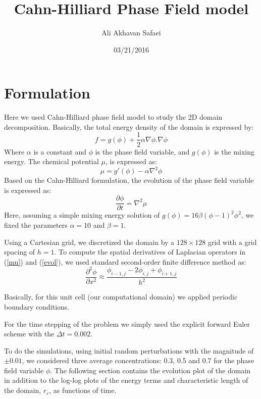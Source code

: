\documentclass[a4paper,6pt]{article}
\begin{document}
\title{\bf Cahn-Hilliard Phase Field model}
\author{Ali Akhavan Safaei}
\date{03/21/2016}
\maketitle

\section{Formulation}

Here we used Cahn-Hilliard phase field model to study the 2D domain decomposition. Basically, the total energy density of the domain is expressed by:
\begin{equation}\label{f}
f = g(\phi) + \frac{1}{2}\alpha \nabla\phi.\nabla\phi
\end{equation}
Where $\alpha$ is a constant and $\phi$ is the phase field variable, and $g(\phi)$ is the mixing energy. The chemical potential $\mu$, is expressed as:
\begin{equation}\label{mu}
\mu = g'(\phi) - \alpha \nabla^2\phi
\end{equation}
Based on the Cahn-Hilliard formulation, the evolution of the phase field variable is expressed as:
\begin{equation}\label{evol}
\frac{\partial \phi}{\partial t} = \nabla^2\mu
\end{equation}
Here, assuming a simple mixing energy solution of $g(\phi)= 16\beta(\phi-1)^2\phi^2$, we fixed the parameters $\alpha=10$ and $\beta=1$.

Using a Cartesian grid, we discretized the domain by a $128 \times 128$ grid with a grid spacing of $h=1$. To compute the spatial derivatives of Laplacian operators in (\ref{mu}) and (\ref{evol}), we used standard second-order finite difference method as:
\begin{equation}
\frac{\partial^2\phi}{\partial x^2} \approx \frac{\phi_{i-1,j} - 2 \phi_{i,j} + \phi_{i+1,j}}{h^2}
\end{equation}  

Basically, for this unit cell (our computational domain) we applied periodic boundary conditions.

For the time stepping of the problem we simply used the explicit forward Euler scheme with the $\Delta t = 0.002$.

To do the simulations, using initial random perturbations with the magnitude of $\pm 0.01$, we considered three average concentrations: 0.3, 0.5 and 0.7 for the phase field variable $\phi$. The following section contains the evolution plot of the domain in addition to the log-log plots of the energy terms and characteristic length of the domain, $r_{c}$, as functions of time.
\end{document}
